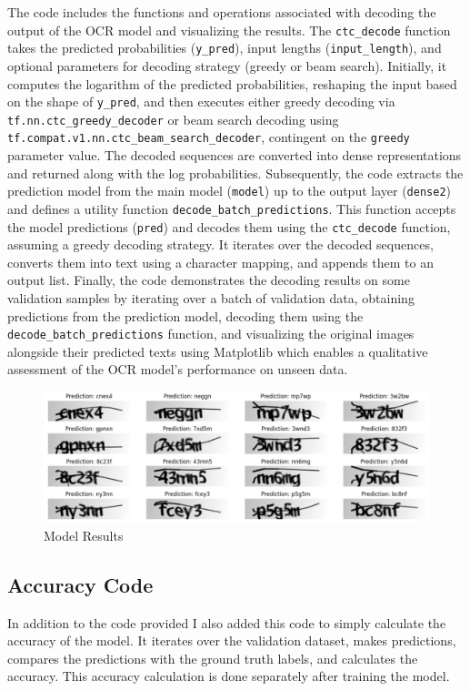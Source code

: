 \documentclass[10pt,twocolumn]{article}
\begin{document}
The code includes the functions and operations associated with decoding the output of the OCR model and visualizing the results. The \texttt{ctc\_decode} function takes the predicted probabilities (\texttt{y\_pred}), input lengths (\texttt{input\_length}), and optional parameters for decoding strategy (greedy or beam search). Initially, it computes the logarithm of the predicted probabilities, reshaping the input based on the shape of \texttt{y\_pred}, and then executes either greedy decoding via \texttt{tf.nn.ctc\_greedy\_decoder} or beam search decoding using \texttt{tf.compat.v1.nn.ctc\_beam\_search\_decoder}, contingent on the \texttt{greedy} parameter value. The decoded sequences are converted into dense representations and returned along with the log probabilities. Subsequently, the code extracts the prediction model from the main model (\texttt{model}) up to the output layer (\texttt{dense2}) and defines a utility function \texttt{decode\_batch\_predictions}. This function accepts the model predictions (\texttt{pred}) and decodes them using the \texttt{ctc\_decode} function, assuming a greedy decoding strategy. It iterates over the decoded sequences, converts them into text using a character mapping, and appends them to an output list. Finally, the code demonstrates the decoding results on some validation samples by iterating over a batch of validation data, obtaining predictions from the prediction model, decoding them using the \texttt{decode\_batch\_predictions} function, and visualizing the original images alongside their predicted texts using Matplotlib which enables a qualitative assessment of the OCR model's performance on unseen data.
\begin{figure}
    \centering
    \includegraphics[width=1\linewidth]{captcha results.png}
    \caption{Model Results}
    \label{fig:enter-label}
\end{figure}
\subsection{Accuracy Code}
In addition to the code provided I also added this code to simply calculate the accuracy of the model. It iterates over the validation dataset, makes predictions, compares the predictions with the ground truth labels, and calculates the accuracy. This accuracy calculation is done separately after training the model.
\end{document}
